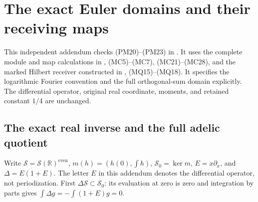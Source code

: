 \section{The exact Euler domains and their receiving maps}


This independent addendum checks (PM20)--(PM23) in
.
It uses the complete module and map calculations in
,
(MC5)--(MC7), (MC21)--(MC28), and the marked Hilbert receiver
constructed in ,
(MQ15)--(MQ18). It specifies the logarithmic Fourier convention
and the full orthogonal-sum domain explicitly. The differential
operator, original real coordinate, moments, and retained constant
$1/4$ are unchanged.

\subsection{The exact real inverse and the full adelic quotient}

Write $\mathscr S=\mathcal S(\mathbb R)^{\mathrm{even}}$,
$m(h)=(h(0),\int h)$, $\mathscr S_0=\ker m$,
$E=x\partial_x$, and $\Delta=E(1+E)$. The letter $E$ in
this addendum denotes the differential operator, not periodization.
First $\Delta\mathscr S\subset\mathscr S_0$: its evaluation at
zero is zero and integration by parts gives
$\int\Delta g=-\int(1+E)g=0$.

